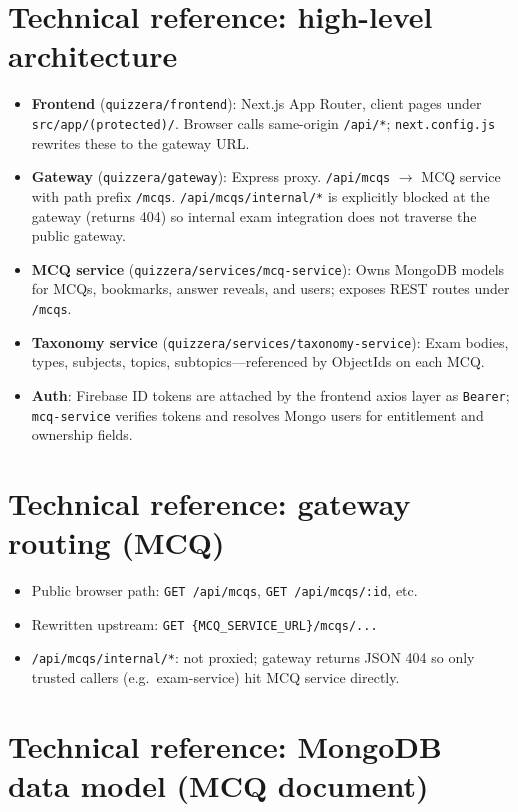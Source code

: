 \documentclass[11pt,a4paper]{article}
\begin{document}
\newpage

\section{Technical reference: high-level architecture}

\begin{itemize}[leftmargin=*]
  \item \textbf{Frontend} (\texttt{quizzera/frontend}): Next.js App Router, client pages under \texttt{src/app/(protected)/}. Browser calls same-origin \texttt{/api/*}; \texttt{next.config.js} rewrites these to the gateway URL.
  \item \textbf{Gateway} (\texttt{quizzera/gateway}): Express proxy. \texttt{/api/mcqs} $\rightarrow$ MCQ service with path prefix \texttt{/mcqs}. \texttt{/api/mcqs/internal/*} is explicitly blocked at the gateway (returns 404) so internal exam integration does not traverse the public gateway.
  \item \textbf{MCQ service} (\texttt{quizzera/services/mcq-service}): Owns MongoDB models for MCQs, bookmarks, answer reveals, and users; exposes REST routes under \texttt{/mcqs}.
  \item \textbf{Taxonomy service} (\texttt{quizzera/services/taxonomy-service}): Exam bodies, types, subjects, topics, subtopics---referenced by ObjectIds on each MCQ.
  \item \textbf{Auth}: Firebase ID tokens are attached by the frontend axios layer as \texttt{Bearer}; \texttt{mcq-service} verifies tokens and resolves Mongo users for entitlement and ownership fields.
\end{itemize}

\section{Technical reference: gateway routing (MCQ)}

\begin{itemize}[leftmargin=*]
  \item Public browser path: \texttt{GET /api/mcqs}, \texttt{GET /api/mcqs/:id}, etc.
  \item Rewritten upstream: \texttt{GET \{MCQ\_SERVICE\_URL\}/mcqs/...}
  \item \texttt{/api/mcqs/internal/*}: not proxied; gateway returns JSON 404 so only trusted callers (e.g.\ exam-service) hit MCQ service directly.
\end{itemize}

\section{Technical reference: MongoDB data model (MCQ document)}
\end{document}
